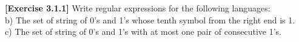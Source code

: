 \textbf{[Exercise 3.1.1]} Write regular expressions for the following languages:\\
b) The set of string of 0's and 1's whose tenth symbol from the right end is 1.\\
c) The set of string of 0's and 1's with at most one pair of consecutive 1's.
